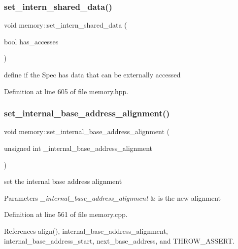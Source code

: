 \subsubsection{\texorpdfstring{set\+\_\+intern\+\_\+shared\+\_\+data()}{set\_intern\_shared\_data()}}
{\footnotesize\ttfamily void memory\+::set\+\_\+intern\+\_\+shared\+\_\+data (\begin{DoxyParamCaption}\item[{bool}]{has\+\_\+accesses }\end{DoxyParamCaption})\hspace{0.3cm}{\ttfamily [inline]}}



define if the Spec has data that can be externally accessed 



Definition at line 605 of file memory.\+hpp.

\mbox{\label{classmemory_a104f9ba5a915851cfefe36fd606dc178}} 
\subsubsection{\texorpdfstring{set\+\_\+internal\+\_\+base\+\_\+address\+\_\+alignment()}{set\_internal\_base\_address\_alignment()}}
{\footnotesize\ttfamily void memory\+::set\+\_\+internal\+\_\+base\+\_\+address\+\_\+alignment (\begin{DoxyParamCaption}\item[{unsigned int}]{\+\_\+internal\+\_\+base\+\_\+address\+\_\+alignment }\end{DoxyParamCaption})}



set the internal base address alignment 


\begin{DoxyParams}{Parameters}
{\em \+\_\+internal\+\_\+base\+\_\+address\+\_\+alignment} & is the new alignment \\
\hline
\end{DoxyParams}


Definition at line 561 of file memory.\+cpp.



References align(), internal\+\_\+base\+\_\+address\+\_\+alignment, internal\+\_\+base\+\_\+address\+\_\+start, next\+\_\+base\+\_\+address, and T\+H\+R\+O\+W\+\_\+\+A\+S\+S\+E\+RT.




